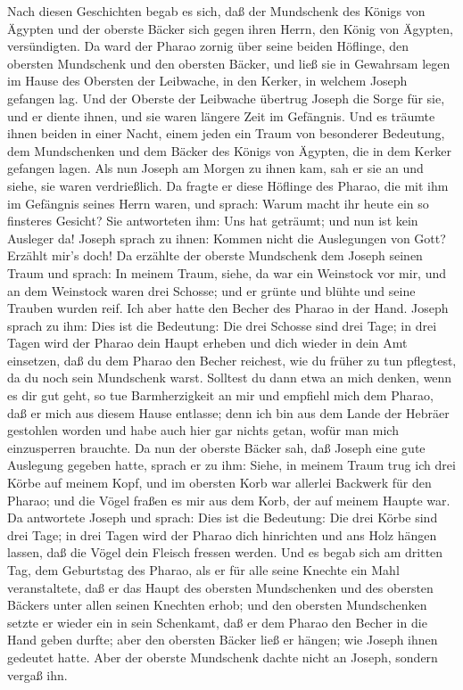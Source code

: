  Nach diesen Geschichten begab es sich, daß der Mundschenk
des Königs von Ägypten und der oberste Bäcker sich gegen ihren Herrn,
den König von Ägypten, versündigten.  Da ward der Pharao
zornig über seine beiden Höflinge, den obersten Mundschenk und den
obersten Bäcker,  und ließ sie in Gewahrsam legen im Hause
des Obersten der Leibwache, in den Kerker, in welchem Joseph gefangen
lag.  Und der Oberste der Leibwache übertrug Joseph die
Sorge für sie, und er diente ihnen, und sie waren längere Zeit im
Gefängnis.  Und es träumte ihnen beiden in einer Nacht,
einem jeden ein Traum von besonderer Bedeutung, dem Mundschenken und dem
Bäcker des Königs von Ägypten, die in dem Kerker gefangen lagen.
 Als nun Joseph am Morgen zu ihnen kam, sah er sie an und
siehe, sie waren verdrießlich.  Da fragte er diese
Höflinge des Pharao, die mit ihm im Gefängnis seines Herrn waren, und
sprach: Warum macht ihr heute ein so finsteres Gesicht? 
Sie antworteten ihm: Uns hat geträumt; und nun ist kein Ausleger da!
Joseph sprach zu ihnen: Kommen nicht die Auslegungen von Gott? Erzählt
mir's doch!  Da erzählte der oberste Mundschenk dem Joseph
seinen Traum und sprach: In meinem Traum, siehe, da war ein Weinstock
vor mir,  und an dem Weinstock waren drei Schosse; und er
grünte und blühte und seine Trauben wurden reif.  Ich
aber hatte den Becher des Pharao in der Hand.  Joseph
sprach zu ihm: Dies ist die Bedeutung: Die drei Schosse sind drei Tage;
 in drei Tagen wird der Pharao dein Haupt erheben und
dich wieder in dein Amt einsetzen, daß du dem Pharao den Becher
reichest, wie du früher zu tun pflegtest, da du noch sein Mundschenk
warst.  Solltest du dann etwa an mich denken, wenn es dir
gut geht, so tue Barmherzigkeit an mir und empfiehl mich dem Pharao, daß
er mich aus diesem Hause entlasse;  denn ich bin aus dem
Lande der Hebräer gestohlen worden und habe auch hier gar nichts getan,
wofür man mich einzusperren brauchte.  Da nun der oberste
Bäcker sah, daß Joseph eine gute Auslegung gegeben hatte, sprach er zu
ihm: Siehe, in meinem Traum trug ich drei Körbe auf meinem Kopf,
 und im obersten Korb war allerlei Backwerk für den
Pharao; und die Vögel fraßen es mir aus dem Korb, der auf meinem Haupte
war.  Da antwortete Joseph und sprach: Dies ist die
Bedeutung: Die drei Körbe sind drei Tage;  in drei Tagen
wird der Pharao dich hinrichten und ans Holz hängen lassen, daß die
Vögel dein Fleisch fressen werden.  Und es begab sich am
dritten Tag, dem Geburtstag des Pharao, als er für alle seine Knechte
ein Mahl veranstaltete, daß er das Haupt des obersten Mundschenken und
des obersten Bäckers unter allen seinen Knechten erhob; 
und den obersten Mundschenken setzte er wieder ein in sein Schenkamt,
daß er dem Pharao den Becher in die Hand geben durfte; 
aber den obersten Bäcker ließ er hängen; wie Joseph ihnen gedeutet
hatte.  Aber der oberste Mundschenk dachte nicht an
Joseph, sondern vergaß ihn.

